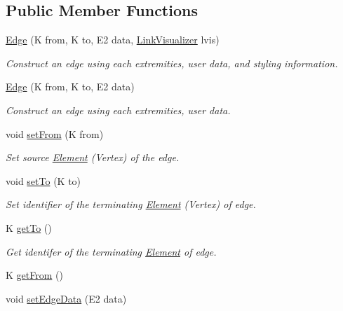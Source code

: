 \subsection*{Public Member Functions}
\begin{DoxyCompactItemize}
\item 
\hyperlink{classbridges_1_1base_1_1_edge_a2a17f458612fbcee8e9efb8d91a6cc18}{Edge} (K from, K to, E2 data, \hyperlink{classbridges_1_1base_1_1_link_visualizer}{Link\+Visualizer} lvis)
\begin{DoxyCompactList}\small\item\em Construct an edge using each extremities, user data, and styling information. \end{DoxyCompactList}\item 
\hyperlink{classbridges_1_1base_1_1_edge_aa4c753100fb92b8e6c1c6b7dc675f094}{Edge} (K from, K to, E2 data)
\begin{DoxyCompactList}\small\item\em Construct an edge using each extremities, user data. \end{DoxyCompactList}\item 
void \hyperlink{classbridges_1_1base_1_1_edge_aef1a55d996fc36217629b884435b9f35}{set\+From} (K from)
\begin{DoxyCompactList}\small\item\em Set source \hyperlink{classbridges_1_1base_1_1_element}{Element} (Vertex) of the edge. \end{DoxyCompactList}\item 
void \hyperlink{classbridges_1_1base_1_1_edge_a5e574139711be3f96c42da02a2702aea}{set\+To} (K to)
\begin{DoxyCompactList}\small\item\em Set identifier of the terminating \hyperlink{classbridges_1_1base_1_1_element}{Element} (Vertex) of edge. \end{DoxyCompactList}\item 
K \hyperlink{classbridges_1_1base_1_1_edge_ab451c13aa8173b5ef1cc2b2dd4f8508f}{get\+To} ()
\begin{DoxyCompactList}\small\item\em Get identifer of the terminating \hyperlink{classbridges_1_1base_1_1_element}{Element} of edge. \end{DoxyCompactList}\item 
K \hyperlink{classbridges_1_1base_1_1_edge_afc23a7c2ee8ab4c4f0950c9bf25edd56}{get\+From} ()
\item 
void \hyperlink{classbridges_1_1base_1_1_edge_a733d7f5eb4950d1fc4e14b7096faeb5c}{set\+Edge\+Data} (E2 data)

\end{DoxyCompactItemize}
